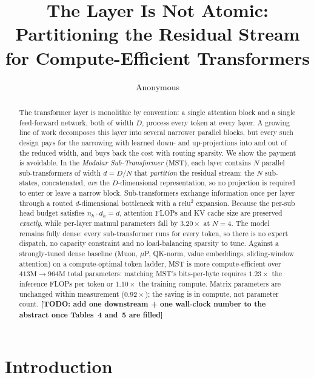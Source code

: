 \documentclass{article}
\title{The Layer Is Not Atomic: \\ Partitioning the Residual Stream \\ for Compute-Efficient Transformers}
\author{Anonymous}
\newcommand{\TODO}[1]{{\color{red}\textbf{[TODO: #1]}}}
\newcommand{\dmodel}{D}
\newcommand{\dsub}{d}
\newcommand{\nsub}{N}
\begin{document}
\maketitle

\begin{abstract}
The transformer layer is monolithic by convention: a single attention block and a
single feed-forward network, both of width $\dmodel$, process every token at every
layer. A growing line of work decomposes this layer into several narrower parallel
blocks, but every such design pays for the narrowing with learned down- and
up-projections into and out of the reduced width, and buys back the cost with
routing sparsity. We show the payment is avoidable. In the \emph{Modular
Sub-Transformer} (MST), each layer contains $\nsub$ parallel sub-transformers of
width $\dsub = \dmodel/\nsub$ that \emph{partition} the residual stream: the
$\nsub$ sub-states, concatenated, \emph{are} the $\dmodel$-dimensional
representation, so no projection is required to enter or leave a narrow block.
Sub-transformers exchange information once per layer through a routed
$\dsub$-dimensional bottleneck with a $\mathrm{relu}^2$ expansion. Because the
per-sub head budget satisfies $n_h\!\cdot\!d_h = \dsub$, attention FLOPs and KV
cache size are preserved \emph{exactly}, while per-layer matmul parameters fall by
$3.20\times$ at $\nsub{=}4$. The model remains fully dense: every
sub-transformer runs for every token, so there is no expert dispatch, no
capacity constraint and no load-balancing sparsity to tune. Against a
strongly-tuned dense baseline (Muon, $\mu$P, QK-norm, value embeddings,
sliding-window attention) on a compute-optimal token ladder, MST is
more compute-efficient over $413\mathrm{M}\!\rightarrow\!964\mathrm{M}$ total
parameters: matching MST's bits-per-byte requires $1.23\times$ the inference FLOPs
per token or $1.10\times$ the training compute. Matrix parameters are unchanged
within measurement ($0.92\times$); the saving is in compute, not parameter count.
\TODO{add one downstream + one wall-clock number to the abstract once Tables~4 and~5 are filled}
\end{abstract}

\section{Introduction}
\end{document}

